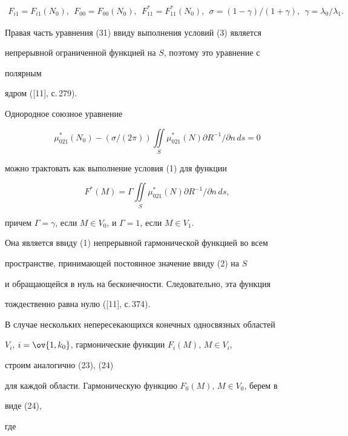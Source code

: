 \begin{pf}
\begin{gather*}
% 


F_{i1}=F_{i1}(N_0),\ \ F_{00}=F_{00}(N_0),\ \  


F^*_{11}=F^*_{11}(N_0),\ \ \sigma=(1-\gamma)/(1+\gamma), 


\ \ \gamma=\lambda_0/\lambda_1. 


\end{gather*} 


Правая часть уравнения (31) ввиду выполнения условий (3) является  


непрерывной ограниченной функцией на $S$, поэтому это уравнение с 


полярным  


ядром ([11], с.\,279). 


 


Однородное союзное уравнение 


$$ 


\mu^*_{021}(N_0)-(\sigma/(2\pi))\iint\limits_S 


\mu^*_{021}(N)\partial R^{-1}/\partial n\,d s=0 


$$ 


можно трактовать как выполнение условия (1) для функции 


$$ 


F^*(M)=\Gamma\iint\limits_S \mu^*_{021}(N) 


\partial R^{-1}/\partial n\,d s, 


$$ 


причем $\Gamma=\gamma$, если $M\in V_0$, и $\Gamma=1$, если $M\in V_1$. 


Она является ввиду (1) непрерывной гармонической функцией во всем 


пространстве, принимающей постоянное значение ввиду (2) на $S$ 


и обращающейся в нуль на бесконечности. Следовательно, эта функция 


тождественно равна нулю ([11], с.\,374). 


 


В случае нескольких непересекающихся конечных односвязных областей  


$V_i$, $i=\ov{1,k_0}$, гармонические функции $F_i(M)$, $M\in V_i$, 


строим аналогично (23), (24)  


для каждой области. Гармоническую функцию $F_0(M)$, $M\in V_0$, берем в 


виде (24),  


где 



\end{pf}
